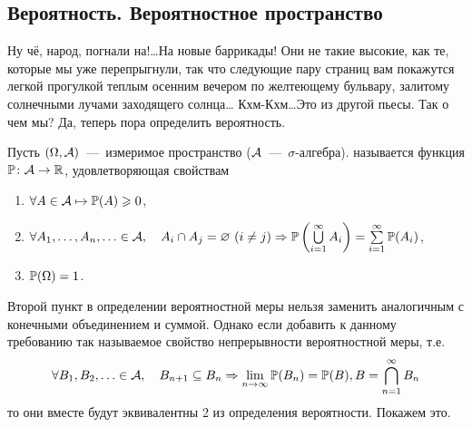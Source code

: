 \documentclass[../TV&MS.tex]{subfiles}
\begin{document}
\subsection{Вероятность. Вероятностное пространство}
	
\qquad Ну чё, народ, погнали на!\dots На новые баррикады! Они не такие высокие, как те, 
которые мы уже перепрыгнули, так что следующие пару страниц вам покажутся легкой прогулкой
теплым осенним вечером по желтеющему бульвару, залитому солнечными лучами заходящего солнца\dots
Кхм-Кхм\dots Это из другой пьесы. Так о чем мы? Да, теперь пора определить вероятность.

\begin{Def}
    Пусть $(\Omega, \mathcal{A})$~---~измеримое пространство 
    ($\mathcal{A}$~---~$\sigma$-алгебра).
	 называется функция $\mathbb{P} \colon \mathcal{A}\rightarrow \mathbb{R}$, 
	удовлетворяющая свойствам
\begin{enumerate}
	\item $\forall A \in \mathcal{A} \mapsto \mathbb{P} (A) \geqslant 0$,
    \item $\forall A_1, \ldots, A_n, \ldots \in \mathcal{A}, \quad A_i \cap A_j  = \varnothing\  
    (i \not= j)  \Rightarrow \mathbb{P} \left(\bigcup\limits_{i=1}^{\infty} A_i\right) = 
    \sum\limits_{i = 1}^{\infty}\mathbb{P}(A_i)$,
	\item $\mathbb{P} (\Omega) = 1$.
\end{enumerate}
\end{Def}

Второй пункт в определении вероятностной меры нельзя заменить аналогичным с конечными 
объединением и суммой. Однако если добавить к данному требованию так называемое свойство 
непрерывности вероятностной меры, т.е.
$$
	\forall B_1, B_2, \ldots \in \mathcal{A}, \quad B_{n+1} \subseteq B_n 
	\Rightarrow \lim_{n \to \infty} \mathbb{P}(B_n) = \mathbb{P}(B), B = \bigcap_{n=1}^\infty B_n
$$
то они вместе будут эквивалентны 2 из определения вероятности. Покажем это.
\end{document}
